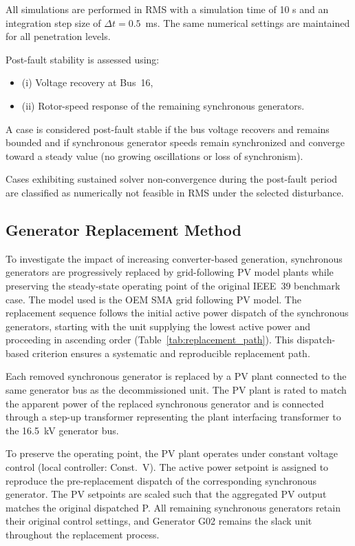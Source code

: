 All simulations are performed in RMS with a simulation time of 10 s and an integration step size of $\Delta t = 0.5$~ms. The same numerical settings are maintained for all penetration levels.

Post-fault stability is assessed using:
\begin{itemize}
    \item (i) Voltage recovery at Bus~16,
    \item (ii) Rotor-speed response of the remaining synchronous generators.
\end{itemize}

A case is considered post-fault stable if the bus voltage recovers and remains bounded and if synchronous generator speeds remain synchronized and converge toward a steady value (no growing oscillations or loss of synchronism).

Cases exhibiting sustained solver non-convergence during the post-fault period are classified as numerically not feasible in RMS under the selected disturbance.





\subsection{Generator Replacement Method}


To investigate the impact of increasing converter-based generation, synchronous generators are progressively replaced by grid-following PV model plants while preserving the steady-state operating point of the original IEEE~39 benchmark case. The model used is the OEM SMA grid following PV model. The replacement sequence follows the initial active power dispatch of the synchronous generators, starting with the unit supplying the lowest active power and proceeding in ascending order (Table~\ref{tab:replacement_path}). This dispatch-based criterion ensures a systematic and reproducible replacement path.

Each removed synchronous generator is replaced by a PV plant connected to the same generator bus as the decommissioned unit. The PV plant is rated to match the apparent power of the replaced synchronous generator and is connected through a step-up transformer representing the plant interfacing transformer to the 16.5~kV generator bus.

To preserve the operating point, the PV plant operates under constant voltage control (local controller: Const.~V). The active power setpoint is assigned to reproduce the pre-replacement dispatch of the corresponding synchronous generator. The PV setpoints are scaled such that the aggregated PV output matches the original dispatched P. All remaining synchronous generators retain their original control settings, and Generator G02 remains the slack unit throughout the replacement process.

